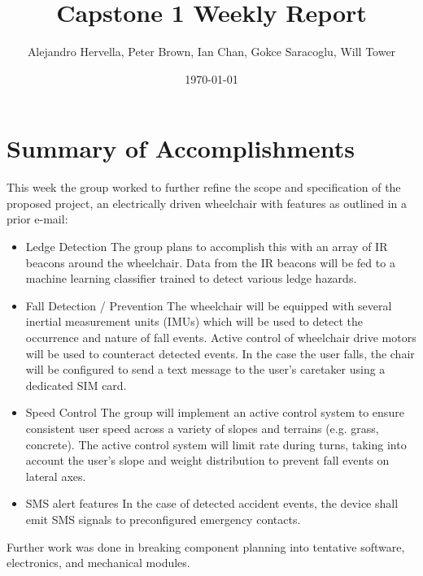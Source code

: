 \documentclass[11pt]{article}
\author{Alejandro Hervella, Peter Brown, Ian Chan, Gokce Saracoglu, Will Tower}
\date{\today}
\title{Capstone 1 Weekly Report}
\begin{document}
\maketitle
\tableofcontents



\section{Summary of Accomplishments}
\label{sec:org039b0b1}

This week the group worked to further refine the scope and specification of the proposed project, an electrically driven wheelchair with features as outlined in a prior e-mail:
\begin{itemize}
\item Ledge Detection
The group plans to accomplish this with an array of IR beacons around the wheelchair. Data from the IR beacons will be fed to a machine learning classifier trained to detect various ledge hazards.
\item Fall Detection / Prevention
The wheelchair will be equipped with several inertial measurement units (IMUs) which will be used to detect the occurrence and nature of fall events. Active control of wheelchair drive motors will be used to counteract detected events.
In the case the user falls, the chair will be configured to send a text message to the user's caretaker using a dedicated SIM card.
\item Speed Control
The group will implement an active control system to ensure consistent user speed across a variety of slopes and terrains (e.g. grass, concrete). The active control system will limit rate during turns, taking into account the user's slope and weight distribution to prevent fall events on lateral axes.
\item SMS alert features
In the case of detected accident events, the device shall emit SMS signals to preconfigured emergency contacts.
\end{itemize}


Further work was done in breaking component planning into tentative software, electronics, and mechanical modules.
\end{document}
